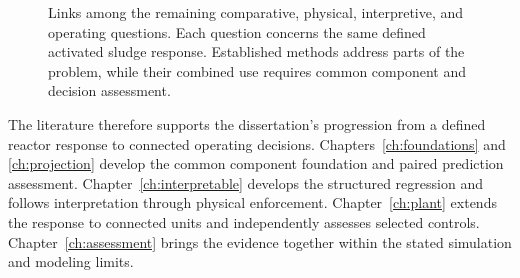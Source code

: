 \begin{figure}[htbp]
\centering
\begingroup\linespread{1}\selectfont

\endgroup
\caption{Links among the remaining comparative, physical, interpretive, and operating questions. Each question concerns the same defined activated sludge response. Established methods address parts of the problem, while their combined use requires common component and decision assessment.}
\label{fig:rrl_intersecting_gaps}
\end{figure}

The literature therefore supports the dissertation's progression from a defined reactor response to connected operating decisions. Chapters~\ref{ch:foundations} and \ref{ch:projection} develop the common component foundation and paired prediction assessment. Chapter~\ref{ch:interpretable} develops the structured regression and follows interpretation through physical enforcement. Chapter~\ref{ch:plant} extends the response to connected units and independently assesses selected controls. Chapter~\ref{ch:assessment} brings the evidence together within the stated simulation and modeling limits.
